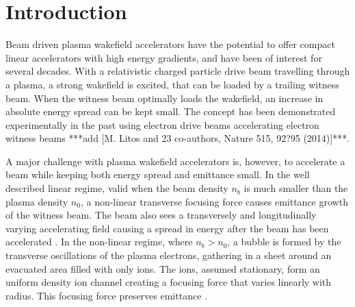 \documentclass[aps,prstab,reprint,amsmath,amssymb,groupedaddress,onecolumn]{revtex4-1}
\begin{document}
\maketitle

\section{Introduction}\label{S:I}

Beam driven plasma wakefield accelerators \cite{chen:1985} have the potential to offer compact linear accelerators with high energy
gradients, and have been of interest for several decades. With a relativistic charged particle drive
beam travelling through a plasma, a strong wakefield is excited, that can be loaded by a trailing witness beam. When the
witness beam optimally loads the wakefield, an increase in absolute energy spread can be kept small. %
The concept
has been demonstrated experimentally in the past using electron drive beams accelerating electron witness beams
\cite{rosenzweig:1988, blumenfeld:2007, kallos:2008} ***add [M. Litos and 23 co-authors, Nature 515, 92?95 (2014)]***. 

A major challenge with plasma wakefield accelerators is, however, to accelerate a beam while keeping both energy spread and
emittance small. %
In the well described linear regime, valid when the beam density $n_{b}$ is much smaller than the
plasma density $n_{0}$, a non-linear transverse focusing force causes emittance growth of the witness beam. The beam
also sees a transversely and longitudinally varying accelerating field causing a spread in energy after the beam has
been accelerated \cite{katsouleas:1987}. In the non-linear regime, where $n_{b} > n_{0}$, a bubble is formed by the
transverse oscillations of the plasma electrons, %
gathering in a sheet around an evacuated area filled with only ions. The
ions, assumed stationary, form an uniform density ion channel creating a focusing force that varies linearly with
radius. This %
focusing force %
preserves emittance \cite{rosenzweig:1991}.
\end{document}
